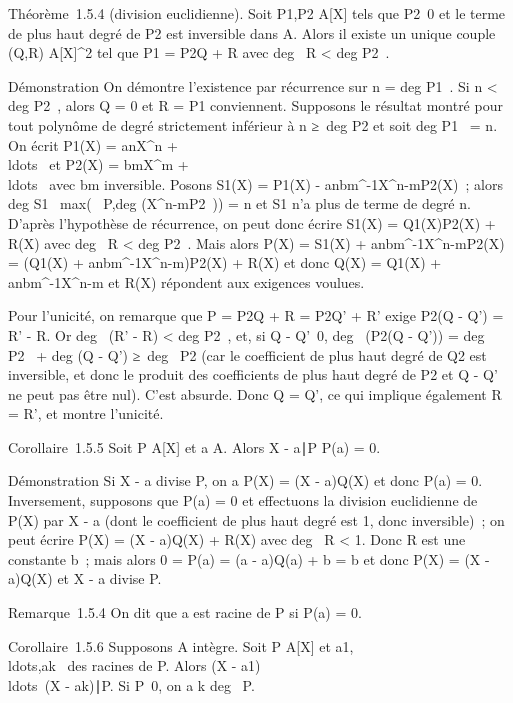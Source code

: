 Théorème~1.5.4 (division euclidienne). Soit P1,P2 \in
A{[}X{]} tels que P2\neq~0 et le terme
de plus haut degré de P2 est inversible dans A. Alors il
existe un unique couple (Q,R) \in A{[}X{]}^2 tel que
P1 = P2Q + R avec deg~ R
\textless{} deg P2~.

Démonstration On démontre l'existence par récurrence sur n
= deg P1~. Si n
\textless{} deg P2~, alors Q = 0 et R
= P1 conviennent. Supposons le résultat montré pour tout
polynôme de degré strictement inférieur à n ≥\
deg P2 et soit deg P1~ =
n. On écrit P1(X) = anX^n +
\\ldots~ et
P2(X) = bmX^m +
\\ldots~ avec
bm inversible. Posons S1(X) = P1(X) -
anbm^-1X^n-mP2(X)~;
alors deg S1~
\leq max(\deg~
P,deg (X^n-mP2~)) = n et
S1 n'a plus de terme de degré n. D'après l'hypothèse de
récurrence, on peut donc écrire S1(X) =
Q1(X)P2(X) + R(X) avec deg~
R \textless{} deg P2~. Mais alors
P(X) = S1(X) +
anbm^-1X^n-mP2(X) =
(Q1(X) +
anbm^-1X^n-m)P2(X) +
R(X) et donc Q(X) = Q1(X) +
anbm^-1X^n-m et R(X) répondent aux
exigences voulues.

Pour l'unicité, on remarque que P = P2Q + R = P2Q' +
R' exige P2(Q - Q') = R' - R. Or deg~
(R' - R) \textless{} deg P2~, et, si
Q - Q'\neq~0, deg~
(P2(Q - Q')) = deg P2~
+ deg (Q - Q') ≥\ deg~
P2 (car le coefficient de plus haut degré de Q2 est
inversible, et donc le produit des coefficients de plus haut degré de
P2 et Q - Q' ne peut pas être nul). C'est absurde. Donc Q =
Q', ce qui implique également R = R', et montre l'unicité.

Corollaire~1.5.5 Soit P \in A{[}X{]} et a \in A. Alors X -
a∣P \mathrel\Leftrightarrow P(a) = 0.

Démonstration Si X - a divise P, on a P(X) = (X - a)Q(X) et donc P(a) =
0. Inversement, supposons que P(a) = 0 et effectuons la division
euclidienne de P(X) par X - a (dont le coefficient de plus haut degré
est 1, donc inversible)~; on peut écrire P(X) = (X - a)Q(X) + R(X) avec
deg~ R \textless{} 1. Donc R est une constante
b~; mais alors 0 = P(a) = (a - a)Q(a) + b = b et donc P(X) = (X - a)Q(X)
et X - a divise P.

Remarque~1.5.4 On dit que a est racine de P si P(a) = 0.

Corollaire~1.5.6 Supposons A intègre. Soit P \in A{[}X{]} et
a1,\\ldots,ak~
des racines de P. Alors (X -
a1)\\ldots~(X
- ak)∣P. Si
P\neq~0, on a k \leq deg~
P.

